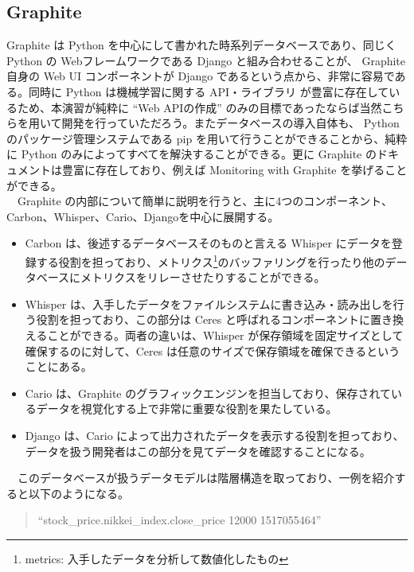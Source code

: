 \documentclass[dvipdfmx]{scrartcl}
\begin{document}
\subsection{Graphite}
\label{sec:orge6498d3}
Graphite は Python を中心にして書かれた時系列データベースであり、同じく Python の Webフレームワークである Django と組み合わせることが、 Graphite 自身の Web UI コンポーネントが Django であるという点から、非常に容易である。同時に Python は機械学習に関する API・ライブラリ が豊富に存在しているため、本演習が純粋に ``Web APIの作成'' のみの目標であったならば当然こちらを用いて開発を行っていただろう。またデータベースの導入自体も、 Python のパッケージ管理システムである pip を用いて行うことができることから、純粋に Python のみによってすべてを解決することができる。更に Graphite のドキュメントは豊富に存在しており、例えば Monitoring with Graphite \cite{graphite-oreilly} を挙げることができる。\\
　Graphite の内部について簡単に説明を行うと、主に4つのコンポーネント、Carbon、Whisper、Cario、Djangoを中心に展開する。\\
\begin{itemize}
\item Carbon は、後述するデータベースそのものと言える Whisper にデータを登録する役割を担っており、メトリクス\footnote[1]{metrics: 入手したデータを分析して数値化したもの}のバッファリングを行ったり他のデータベースにメトリクスをリレーさせたりすることができる。\\
\item Whisper は、入手したデータをファイルシステムに書き込み・読み出しを行う役割を担っており、この部分は Ceres と呼ばれるコンポーネントに置き換えることができる。両者の違いは、Whisper が保存領域を固定サイズとして確保するのに対して、Ceres は任意のサイズで保存領域を確保できるということにある。\\
\item Cario は、Graphite のグラフィックエンジンを担当しており、保存されているデータを視覚化する上で非常に重要な役割を果たしている。\\
\item Django は、Cario によって出力されたデータを表示する役割を担っており、データを扱う開発者はこの部分を見てデータを確認することになる。\\
\end{itemize}

　このデータベースが扱うデータモデルは階層構造を取っており、一例を紹介すると以下のようになる。\\
\begin{verse}
``stock\_price.nikkei\_index.close\_price 12000 1517055464''\\
\end{verse}
\end{document}
